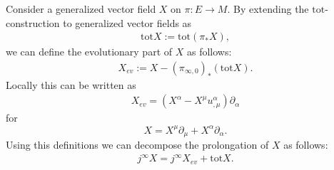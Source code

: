     \begin{property}
        Consider a generalized vector field $X$ on $\pi:E\rightarrow M$. By extending the $\text{tot}$-construction to generalized vector fields as
        \begin{gather}
            \text{tot}X:=\text{tot}(\pi_*X),
        \end{gather}
        we can define the evolutionary part of $X$ as follows:
        \begin{gather}
            X_{ev}:=X-(\pi_{\infty,0})_*(\text{tot}X).
        \end{gather}
        Locally this can be written as
        \begin{gather}
            X_{ev} = \left(X^\alpha - X^\mu u^\alpha_{,\mu}\right)\partial_\alpha
        \end{gather}
        for \[X = X^\mu\partial_\mu + X^\alpha\partial_\alpha.\] Using this definitions we can decompose the prolongation of $X$ as follows:
        \begin{gather}
            j^\infty X = j ^\infty X_{ev} + \text{tot}X.
        \end{gather}
    \end{property}

